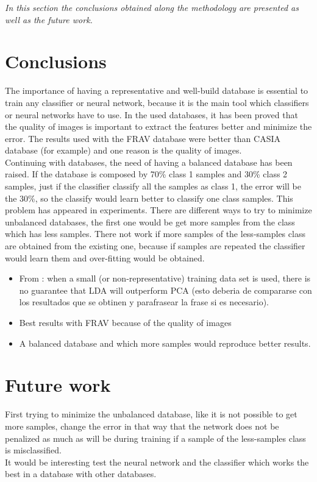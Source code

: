\minitoc
\mtcskip

\begin{small}
\emph{In this section the conclusions obtained along the methodology are presented as well as the future work.\\}
\end{small} 

\section{Conclusions}
The importance of having a representative and well-build database is essential to train any classifier or neural network, because it is the main tool which classifiers or neural networks have to use. In the used databases, it has been proved that the quality of images is important to extract the features better and minimize the error. The results used with the FRAV database were better than CASIA database (for example) and one reason is the quality of images.\\

Continuing with databases, the need of having a balanced database has been raised. If the database is composed by 70\% class 1 samples and 30\% class 2 samples, just if the classifier classify all the samples as class 1, the error will be the 30\%, so the classify would learn better to classify one class samples. This problem has appeared in experiments. There are different ways to try to minimize unbalanced databases, the first one would be get more samples from the class which has less samples. There not work if more samples of the less-samples class are obtained from the existing one, because if samples are repeated the classifier would learn them and over-fitting would be obtained.\\

\begin{itemize}
\item From \cite{PCAvsLDA}: when a small (or non-representative) training data set is used, there is no guarantee that LDA will outperform PCA (esto deberia de compararse con los resultados que se obtinen y parafrasear la frase si es necesario).
\item Best results with FRAV because of the quality of images
\item A balanced database and which more samples would reproduce better results.
\end{itemize}

\section{Future work}
First trying to minimize the unbalanced database, like it is not possible to get more samples, change the error in that way that the network does not be penalized as much as will be during training if a sample of the less-samples class  is misclassified.\\

It would be interesting test the neural network and the classifier which works the best in a database with other databases. \\
